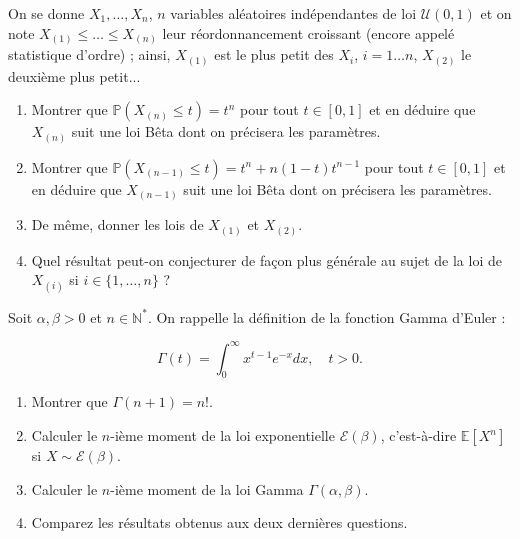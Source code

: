 \medskip

\begin{mdframed}
\begin{exercice}
On se donne $X_1, \dots, X_n$, $n$ variables aléatoires indépendantes de loi $\mathcal{U}(0, 1)$ et on note $X_{(1)} \leq \dots \leq X_{(n)}$ leur réordonnancement croissant (encore appelé statistique d'ordre) ; ainsi, $X_{(1)}$ est le plus petit des $X_i$, $i = 1 \dots n$, $X_{(2)}$ le deuxième plus petit...

\begin{enumerate}
    \item Montrer que $\mathbb{P}(X_{(n)} \leq t) = t^n$ pour tout $t \in [0, 1]$ et en déduire que $X_{(n)}$ suit une loi Bêta dont on précisera les paramètres.
    \item Montrer que $\mathbb{P}(X_{(n-1)} \leq t) = t^n + n(1 - t)t^{n-1}$ pour tout $t \in [0, 1]$ et en déduire que $X_{(n-1)}$ suit une loi Bêta dont on précisera les paramètres.
    \item De même, donner les lois de $X_{(1)}$ et $X_{(2)}$.
    \item Quel résultat peut-on conjecturer de façon plus générale au sujet de la loi de $X_{(i)}$ si $i \in \{1, \dots, n\}$ ?
\end{enumerate}
\end{exercice}
\end{mdframed}

\medskip

\begin{mdframed}
\begin{exercice}
Soit $\alpha, \beta > 0$ et $n \in \mathbb{N}^*$. On rappelle la définition de la fonction Gamma d'Euler :

$$
\Gamma(t) = \int_0^\infty x^{t-1}e^{-x} dx, \quad t > 0.
$$

\begin{enumerate}
    \item Montrer que $\Gamma(n + 1) = n!$.
    \item Calculer le $n$-ième moment de la loi exponentielle $\mathcal{E}(\beta)$, c'est-à-dire $\mathbb{E}[X^n]$ si $X \sim \mathcal{E}(\beta)$.
    \item Calculer le $n$-ième moment de la loi Gamma $\Gamma(\alpha, \beta)$.
    \item Comparez les résultats obtenus aux deux dernières questions.
\end{enumerate}
\end{exercice}
\end{mdframed}

